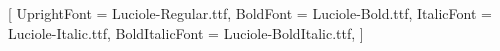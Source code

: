 
\setmainfont{Luciole}[
    UprightFont    = Luciole-Regular.ttf,
    BoldFont       = Luciole-Bold.ttf,
    ItalicFont     = Luciole-Italic.ttf,
    BoldItalicFont = Luciole-BoldItalic.ttf,
]

\AtBeginDocument{%
  \setlength{\parskip}{1.5\baselineskip}%
  \setlength{\parindent}{0pt}%
}

%
\makeatletter
\let\crpsp@afterheading\@afterheading
\renewcommand{\@afterheading}{\crpsp@afterheading\vspace{-\parskip}}
\makeatother

